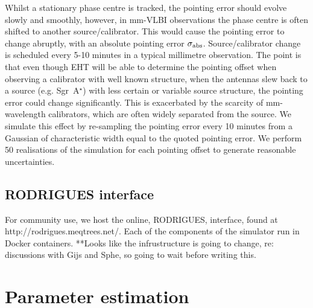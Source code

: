 Whilst a stationary phase centre is tracked, the pointing error should evolve slowly and smoothly, however, in mm-VLBI observations the phase centre is often shifted to another source/calibrator. This would cause the pointing error to change abruptly, with an absolute pointing error $\sigma_{\rm abs}$. Source/calibrator change is scheduled every 5-10 minutes in a typical millimetre observation. The point is that even though EHT will be able to determine the pointing offset when observing a calibrator with well known structure, when the antennas slew back to a source (e.g. Sgr~A$^\star$) with less certain or variable source structure, the pointing error could change significantly. This is exacerbated by the scarcity of mm-wavelength calibrators, which are often widely separated from the source. We simulate this effect by re-sampling the pointing error every 10 minutes from a Gaussian of characteristic width equal to the quoted pointing error. We perform 50 realisations of the simulation for each pointing offset to generate reasonable uncertainties.
\subsection{RODRIGUES interface}
For community use, we host the online, RODRIGUES, interface, found at http://rodrigues.meqtrees.net/. Each of the components of the simulator run in Docker containers. **Looks like the infrustructure is going to change, re: discussions with Gijs and Sphe, so going to wait before writing this.

\section{Parameter estimation}

